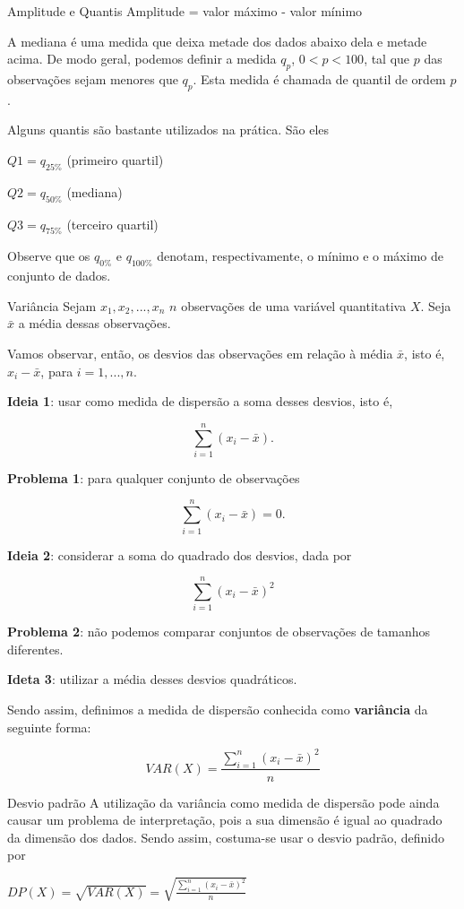 \documentclass[
  9pt,
  ignorenonframetext,
  aspectratio=169]{beamer}
\begin{document}
\begin{frame}{Amplitude e Quantis}
\protect\hypertarget{amplitude-e-quantis}{}
Amplitude = valor máximo - valor mínimo

A mediana é uma medida que deixa metade dos dados abaixo dela e metade
acima. De modo geral, podemos definir a medida \(q_p\), \(0 < p < 100\),
tal que \(p%
\) das observações sejam menores que \(q_p\). Esta medida é chamada de
quantil de ordem \(p\).

Alguns quantis são bastante utilizados na prática. São eles

\(Q1 = q_{25\%}\) (primeiro quartil)

\(Q2 = q_{50\%}\) (mediana)

\(Q3 = q_{75\%}\) (terceiro quartil)

Observe que os \(q_{0\%}\) e \(q_{100\%}\) denotam, respectivamente, o
mínimo e o máximo de conjunto de dados.
\end{frame}

\begin{frame}{Variância}
\protect\hypertarget{variuxe2ncia}{}
Sejam \(x_1, x_2, ..., x_n\) \(n\) observações de uma variável
quantitativa \(X\). Seja \(\bar{x}\) a média dessas observações.

Vamos observar, então, os desvios das observações em relação à média
\(\bar{x}\), isto é, \(x_i - \bar{x}\), para \(i = 1, ..., n\).

\textbf{Ideia 1}: usar como medida de dispersão a soma desses desvios,
isto é,

\[
\sum_{i=1}^{n}(x_i - \bar{x}).
\]

\textbf{Problema 1}: para qualquer conjunto de observações

\[
\sum_{i=1}^{n}(x_i - \bar{x}) = 0.
\]

\textbf{Ideia 2}: considerar a soma do quadrado dos desvios, dada por

\[
\sum_{i=1}^{n}(x_i - \bar{x})^2
\]

\textbf{Problema 2}: não podemos comparar conjuntos de observações de
tamanhos diferentes.

\textbf{Ideta 3}: utilizar a média desses desvios quadráticos.

Sendo assim, definimos a medida de dispersão conhecida como
\textbf{variância} da seguinte forma:

\[
VAR(X) = \frac{\sum_{i=1}^{n}(x_i - \bar{x})^2}{n}
\]
\end{frame}

\begin{frame}{Desvio padrão}
\protect\hypertarget{desvio-padruxe3o}{}
A utilização da variância como medida de dispersão pode ainda causar um
problema de interpretação, pois a sua dimensão é igual ao quadrado da
dimensão dos dados. Sendo assim, costuma-se usar o desvio padrão,
definido por

\(DP(X) = \sqrt{VAR(X)} = \sqrt{\frac{\sum_{i=1}^{n}(x_i - \bar{x})^2}{n}}\)
\end{frame}
\end{document}
